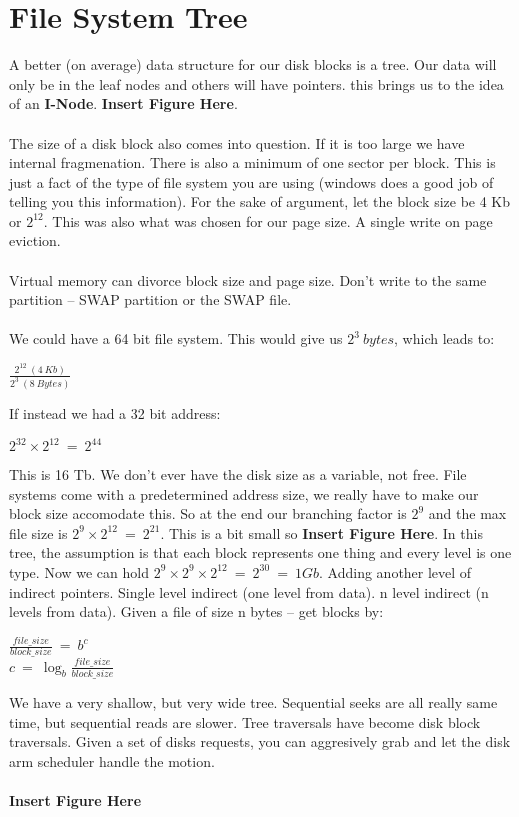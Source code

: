 \documentclass[../base_file/cs1550_notes.tex]{subfiles}
\begin{document}
\section{File System Tree}
A better (on average) data structure for our disk blocks is a tree.
Our data will only be in the leaf nodes and others will have pointers.
this brings us to the idea of an \textbf{I-Node}.  \textbf{Insert Figure
Here}.\\\\
The size of a disk block also comes into question.  If it is too large
we have internal fragmenation.  There is also a minimum of one sector
per block.  This is just a fact of the type of file system you are 
using (windows does a good job of telling you this information).  For
the sake of argument, let the block size be 4 Kb or $2^{12}$. This was
also what was chosen for our page size.  A single write on page eviction.\\\\
Virtual memory can divorce block size and page size.  Don't write to the
same partition -- SWAP partition or the SWAP file.\\\\
We could have a 64 bit file system.  This would give us $2^{3}\ bytes$,
which leads to:
\begin{center}
$\frac{2^{12}\ (4\ Kb)}{2^{3}\ (8\ Bytes)}$
\end{center}
If instead we had a 32 bit address:
\begin{center}
$2^{32}\times 2^{12}\ =\ 2^{44}$
\end{center}
This is 16 Tb.
We don't ever have the disk size as a variable, not free.  File systems
come with a predetermined address size, we really have to make our block
size accomodate this.  So at the end our branching factor is $2^{9}$ and
the max file size is $2^{9}\times 2^{12}\ =\ 2^{21}$.  This is a bit small
so \textbf{Insert Figure Here}.  In this tree, the assumption is that
each block represents one thing and every level is one type.  Now we
can hold $2^{9}\times 2^{9}\times 2^{12}\ =\ 2^{30}\ =\ 1 Gb$.  Adding
another level of indirect pointers.  Single level indirect (one level
from data).  n level indirect (n levels from data).  Given a file of size
n bytes -- get blocks by:
\begin{center}
$\frac{file\_size}{block\_size}\ =\ b^{c}$\\

$c\ =\ \log_b\frac{file\_size}{block\_size}$
\end{center}
We have a very shallow, but very wide tree.  Sequential seeks are all really
same time, but sequential reads are slower.  Tree traversals have become
disk block traversals.  Given a set of disks requests, you can aggresively
grab and let the disk arm scheduler handle the motion.\\\\
\textbf{Insert Figure Here}\\\\
\end{document}
